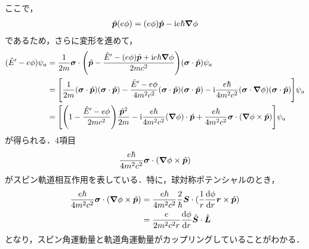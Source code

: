 \documentclass{report}
\begin{document}
  ここで，
  \begin{align}
    \hat{\bm{p}}(e\phi) = (e\phi)\hat{\bm{p}} - \mathrm{i} e \hbar \grad\phi
  \end{align}
  であるため，さらに変形を進めて，
  \begin{align}
    (\hat{E}' - e\phi) \psi_a &= \frac{1}{2m}\bm{\sigma}\cdot\qty(\hat{\bm{p}} - \frac{\hat{E}' - (e\phi)\hat{\bm{p}} + \mathrm{i} e\hbar \grad\phi}{2mc^2})(\bm{\sigma}\cdot\hat{\bm{p}}) \psi_a\\
    &= \qty[\frac{1}{2m}(\bm{\sigma}\cdot\hat{\bm{p}})(\bm{\sigma}\cdot\hat{\bm{p}}) - \frac{\hat{E}' - e\phi}{4m^2c^2}(\bm{\sigma}\cdot\hat{\bm{p}})(\bm{\sigma}\cdot\hat{\bm{p}}) - \mathrm{i} \frac{e\hbar}{4m^2c^2}(\bm{\sigma}\cdot\grad\phi)(\bm{\sigma}\cdot\hat{\bm{p}})]\psi_a\\
    &= \qty[\qty(1 - \frac{\hat{E}' - e\phi}{2mc^2})\frac{\hat{\bm{p}}^2}{2m} - \mathrm{i} \frac{e\hbar}{4m^2c^2}(\grad\phi)\cdot\hat{\bm{p}} + \frac{e\hbar}{4m^2c^2}\bm{\sigma}\cdot(\grad\phi\times\hat{\bm{p}})]\psi_a
  \end{align}
  が得られる．4項目
  \begin{align}
    \frac{e\hbar}{4m^2c^2}\bm{\sigma}\cdot(\grad\phi\times\hat{\bm{p}})
  \end{align}
  がスピン軌道相互作用を表している．特に，球対称ポテンシャルのとき，
  \begin{align}
    \frac{e\hbar}{4m^2c^2}\bm{\sigma}\cdot(\grad\phi\times\hat{\bm{p}}) &= \frac{e\hbar}{4m^2c^2}\frac{2}{\hbar}\bm{\bm{S}}\cdot(\frac{1}{r}\dv{\phi}{r}\bm{r}\times\hat{\bm{p}})\\
    &= \frac{e}{2m^2c^2r}\dv{\phi}{r}\hat{\bm{S}}\cdot\hat{\bm{L}}
  \end{align}
  となり，スピン角運動量と軌道角運動量がカップリングしていることがわかる．
\end{document}
